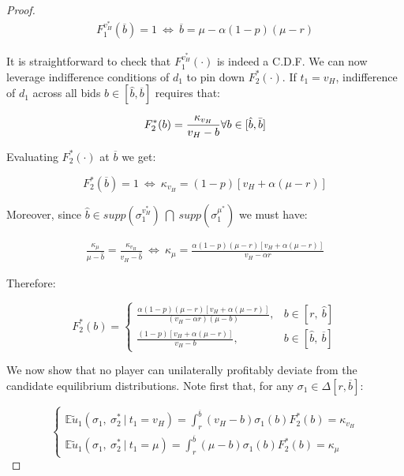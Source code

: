\begin{proof}
\begin{align*}
 F_1^{v_H^*}(\overline{b}) = 1 \ \iff \ \overline{b} = \mu - \alpha(1 - p)(\mu - r)
\end{align*}

\noindent It is straightforward to check that $ F_1^{v_H^*}(\cdot) $ is indeed a C.D.F. We can now leverage indifference conditions of $ d_1 $ to pin down $ F_2^*(\cdot) $. If $ t_1 = v_H $, indifference of $ d_1 $ across all bids $ b \in [\hat{b}, \overline{b}] $ requires that:

\begin{equation*}
 F_2^*(b) = \frac{\kappa_{v_H}}{v_H - b}  \forall b \in [\hat{b}, \Bar{b}]
\end{equation*}

\noindent Evaluating $ F_2^*(\cdot) $ at $ \overline{b} $ we get:

\begin{equation*}
    F_2^*(\overline{b}) = 1 \ \iff \ \kappa_{v_H} = (1 - p)[v_H + \alpha (\mu - r)]
\end{equation*}

\noindent Moreover, since $ \hat{b} \in supp\left( \sigma_1^{v_H^*} \right) \ \bigcap \ supp\left( \sigma_1^{\mu^*} \right) $ we must have:

\begin{align*}
    \frac{\kappa_{\mu}}{\mu - \hat{b}} = \frac{\kappa_{v_H}}{v_H - \hat{b}} \ \iff \
    \kappa_{\mu} = \frac{\alpha (1 - p) (\mu - r) \left[v_H +\alpha (\mu - r) \right]}{v_H - \alpha r}
\end{align*}

\noindent Therefore:

\begin{equation*}
     F_2^*(b) = \begin{cases}
        \frac{\alpha (1 - p) (\mu - r) \left[v_H +\alpha (\mu - r) \right]}{(v_H - \alpha r)(\mu - b)}, & b \in \left[ r, \ \hat{b} \right] \\[5pt]
        \frac{(1 - p)[v_H + \alpha (\mu - r)]}{v_H - b}, & b \in \left[ \hat{b}, \ \overline{b} \right]
    \end{cases}
\end{equation*}

\noindent We now show that no player can unilaterally profitably deviate from the candidate equilibrium distributions. Note first that, for any $ \sigma_1 \in \Delta[r, \overline{b}] $:

\begin{equation*}
 \begin{cases}
   \mathbb{E} \tilde{u}_1 \left( \sigma_1,\ \sigma_2^* \ | \ t_1 = v_H \right) = \int_{r}^{\overline{b}} (v_H - b) \sigma_1(b) F_2^*(b) = \kappa_{v_H} \\[5pt]
   \mathbb{E} \tilde{u}_1 \left( \sigma_1,\ \sigma_2^* \ | \ t_1 = \mu \right) = \int_{r}^{\overline{b}} (\mu - b) \sigma_1(b) F_2^*(b) = \kappa_{\mu}
 \end{cases}
\end{equation*}


\end{proof}
